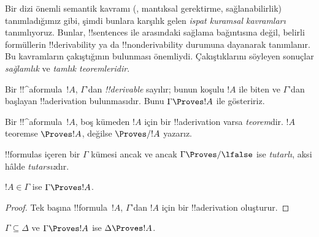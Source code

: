 

      {}
      {}


\begin{explain}
Bir dizi önemli semantik kavramı
(, mantıksal gerektirme, sağlanabilirlik)
tanımladığımız gibi, şimdi bunlara karşılık gelen \emph{ispat kuramsal
kavramları} tanımlıyoruz. Bunlar, !!{sentence}s ile
 arasındaki sağlama bağıntısına değil,
belirli formüllerin !!{derivability} ya da
!!{nonderivability} durumuna dayanarak tanımlanır. Bu kavramların çakıştığının bulunması
önemliydi. Çakıştıklarını söyleyen sonuçlar \emph{sağlamlık} ve
\emph{tamlık teoremleridir}.
\end{explain}

\begin{defn}[!!^{derivability}]
Bir !!^a{formula}~$!A$, $\Gamma$'dan \emph{!!{derivable}} sayılır; bunun
koşulu $!A$ ile biten ve $\Gamma$'dan başlayan !!a{derivation} bulunmasıdır.
Bunu $\Gamma \Proves !A$ ile gösteririz.
\end{defn}

\begin{defn}[Teoremler]
Bir !!^a{formula}~$!A$, boş kümeden $!A$ için bir !!a{derivation} varsa
\emph{teorem}dir. $!A$ teoremse $\Proves !A$, değilse $\Proves/ !A$ yazarız.
\end{defn}

\begin{defn}[Tutarlılık]
!!{formula}s içeren bir $\Gamma$ kümesi ancak ve ancak
$\Gamma\Proves/ \lfalse$ ise \emph{tutarlı}, aksi hâlde \emph{tutarsız}dır.
\end{defn}

\begin{prop}[Yansımalılık]
$!A \in \Gamma$ ise $\Gamma \Proves !A$.
\end{prop}

\begin{proof}
  Tek başına !!{formula}~$!A$, $\Gamma$'dan $!A$ için bir
  !!a{derivation} oluşturur.
\end{proof}

\begin{prop}[Monotonluk]
$\Gamma \subseteq \Delta$ ve $\Gamma \Proves !A$ ise $\Delta \Proves !A$.
\end{prop}


